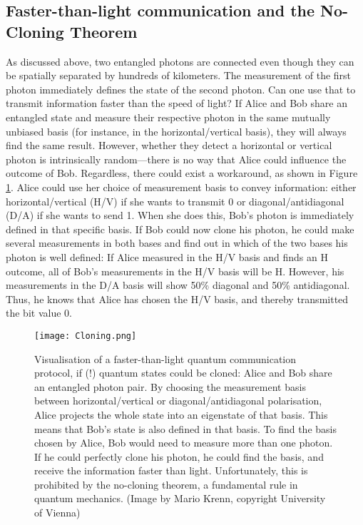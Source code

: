 \documentclass{article}
\begin{document}
\subsection{Faster-than-light communication and the No-Cloning Theorem}
As discussed above, two entangled photons are connected even though they can be spatially separated by hundreds of kilometers. The measurement of the first photon immediately defines the state of the second photon. Can one use that to transmit information faster than the speed of light?
If Alice and Bob share an entangled state and measure their respective photon in the same mutually unbiased basis (for instance, in the horizontal/vertical basis), they will always find the same result. However, whether they detect a horizontal or vertical photon is intrinsically random---there is no way that Alice could influence the outcome of Bob.
Regardless, there could exist a workaround, as shown in Figure \ref{fig:clone}. Alice could use her choice of measurement basis to convey information: either horizontal/vertical (H/V) if she wants to transmit 0 or diagonal/antidiagonal (D/A) if she wants to send 1. When she does this, Bob's photon is immediately defined in that specific basis. If Bob could now clone his photon, he could make several measurements in both bases and find out in which of the two bases his photon is well defined: If Alice measured in the H/V basis and finds an H outcome, all of Bob's measurements in the H/V basis will be H. However, his measurements in the D/A basis will show 50\% diagonal and 50\% antidiagonal. Thus, he knows that Alice has chosen the H/V basis, and thereby transmitted the bit value 0. 

\begin{figure}[h!]
\centering
\texttt{[image: Cloning.png]}
\caption{Visualisation of a faster-than-light quantum communication protocol, if (!) quantum states could be cloned: Alice and Bob share an entangled photon pair. By choosing the measurement basis between horizontal/vertical or diagonal/antidiagonal polarisation, Alice projects the whole state into an eigenstate of that basis. This means that Bob's state is also defined in that basis. To find the basis chosen by Alice, Bob would need to measure more than one photon. If he could perfectly clone his photon, he could find the basis, and receive the information faster than light. Unfortunately, this is prohibited by the no-cloning theorem, a fundamental rule in quantum mechanics.  (Image by Mario Krenn, copyright University of Vienna)}
\label{fig:clone}
\end{figure}
\end{document}
